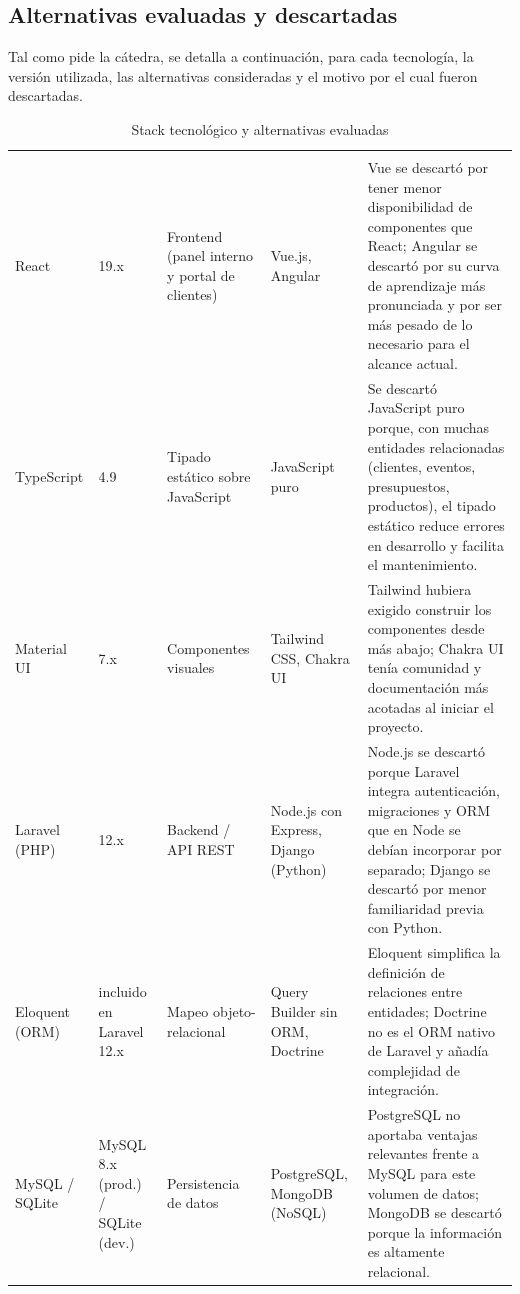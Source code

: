 \subsection{Alternativas evaluadas y descartadas}

Tal como pide la cátedra, se detalla a continuación, para cada
tecnología, la versión utilizada, las alternativas consideradas y el
motivo por el cual fueron descartadas.

\small
\begin{xltabular}{\textwidth}{p{1.9cm} p{1.9cm} p{2.2cm} p{2.4cm} L}
    \caption{Stack tecnológico y alternativas evaluadas}
    \label{tab:stack} \\
    \toprule
     &  &  &  &  \\
    \midrule
    \endfirsthead
    \toprule
     &  &  &  &  \\
    \midrule
    \endhead
    \bottomrule
    \endfoot
        React & 19.x & Frontend (panel interno y portal de clientes) & Vue.js, Angular & Vue se descartó por tener menor disponibilidad de componentes que React; Angular se descartó por su curva de aprendizaje más pronunciada y por ser más pesado de lo necesario para el alcance actual. \\
        TypeScript & 4.9 & Tipado estático sobre JavaScript & JavaScript puro & Se descartó JavaScript puro porque, con muchas entidades relacionadas (clientes, eventos, presupuestos, productos), el tipado estático reduce errores en desarrollo y facilita el mantenimiento. \\
        Material UI & 7.x & Componentes visuales & Tailwind CSS, Chakra UI & Tailwind hubiera exigido construir los componentes desde más abajo; Chakra UI tenía comunidad y documentación más acotadas al iniciar el proyecto. \\
        Laravel (PHP) & 12.x & Backend / API REST & Node.js con Express, Django (Python) & Node.js se descartó porque Laravel integra autenticación, migraciones y ORM que en Node se debían incorporar por separado; Django se descartó por menor familiaridad previa con Python. \\
        Eloquent (ORM) & incluido en Laravel 12.x & Mapeo objeto-relacional & Query Builder sin ORM, Doctrine & Eloquent simplifica la definición de relaciones entre entidades; Doctrine no es el ORM nativo de Laravel y añadía complejidad de integración. \\
        MySQL / SQLite & MySQL 8.x (prod.) / SQLite (dev.) & Persistencia de datos & PostgreSQL, MongoDB (NoSQL) & PostgreSQL no aportaba ventajas relevantes frente a MySQL para este volumen de datos; MongoDB se descartó porque la información es altamente relacional. \\
\end{xltabular}
\normalsize

